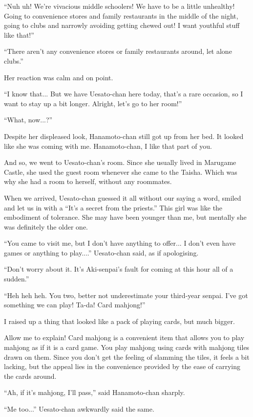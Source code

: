 ``Nuh uh! We're vivacious middle schoolers! We have to be a little unhealthy! Going to convenience stores and family restaurants in the middle of the night, going to clubs and narrowly avoiding getting chewed out! I want youthful stuff like that!''

``There aren't any convenience stores or family restaurants around, let alone clubs.''

Her reaction was calm and on point.

``I know that... But we have Uesato-chan here today, that's a rare occasion, so I want to stay up a bit longer. Alright, let's go to her room!''

``What, now...?''

Despite her displeased look, Hanamoto-chan still got up from her bed. It looked like she was coming with me. Hanamoto-chan, I like that part of you.

And so, we went to Uesato-chan's room. Since she usually lived in Marugame Castle, she used the guest room whenever she came to the Taisha. Which was why she had a room to herself, without any roommates.

When we arrived, Uesato-chan guessed it all without our saying a word, smiled and let us in with a ``It's a secret from the priests.'' This girl was like the embodiment of tolerance. She may have been younger than me, but mentally she was definitely the older one.

``You came to visit me, but I don't have anything to offer... I don't even have games or anything to play....'' Uesato-chan said, as if apologising.

``Don't worry about it. It's Aki-senpai's fault for coming at this hour all of a sudden.''

``Heh heh heh. You two, better not underestimate your third-year senpai. I've got something we can play! Ta-da! Card mahjong!''

I raised up a thing that looked like a pack of playing cards, but much bigger.

Allow me to explain! Card mahjong is a convenient item that allows you to play mahjong as if it is a card game. You play mahjong using cards with mahjong tiles drawn on them. Since you don't get the feeling of slamming the tiles, it feels a bit lacking, but the appeal lies in the convenience provided by the ease of carrying the cards around.

``Ah, if it's mahjong, I'll pass,'' said Hanamoto-chan sharply.

``Me too...'' Uesato-chan awkwardly said the same.

